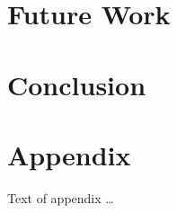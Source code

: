 \documentclass[sigplan,review,anonymous]{acmart}
\begin{document}
\section{Future Work} \label{future}
\section{Conclusion} \label{conclusions}







\appendix
\section{Appendix}

Text of appendix \ldots
\end{document}
